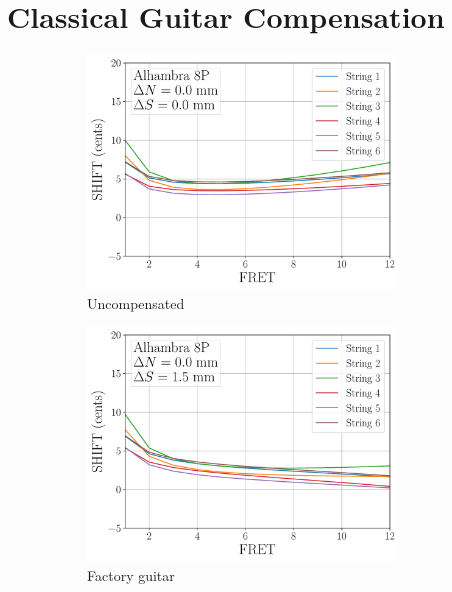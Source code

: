 %
%
%

 \section{Classical Guitar Compensation\label{sct:comp}}

 \begin{figure}
  \centering
  \begin{subfigure}[b]{0.45\textwidth}
   \centering
   \includegraphics[width=3.25in]{figures/shift_uncompensated}
   \caption{Uncompensated}
   \label{fig:shift_uncompensated}
  \end{subfigure}
  \hspace{0.25in}
  \begin{subfigure}[b]{0.45\textwidth}
   \centering
   \includegraphics[width=3.25in]{figures/shift_factory}
   \caption{Factory guitar}
   \label{fig:shift_factory}
  \end{subfigure}
  \par\vspace{0.25in}
  \begin{subfigure}[b]{0.45\textwidth}

\end{subfigure}
\end{figure}

